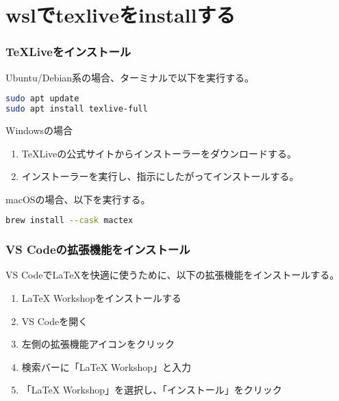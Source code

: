 \documentclass{article}
\begin{document}
\part{wslでtexliveをinstallする}

\section{TeXLiveをインストール}
Ubuntu/Debian系の場合、ターミナルで以下を実行する。\par

\begin{lstlisting}[language=bash]
sudo apt update
sudo apt install texlive-full
\end{lstlisting}

Windowsの場合\par
\begin{enumerate}
\item TeXLiveの公式サイトからインストーラーをダウンロードする。\par
\item インストーラーを実行し、指示にしたがってインストールする。\par
\end{enumerate}

\par
macOSの場合、以下を実行する。\par

\begin{lstlisting}[language=bash]
brew install --cask mactex
\end{lstlisting}

\section{VS Codeの拡張機能をインストール}
VS CodeでLaTeXを快適に使うために、以下の拡張機能をインストールする。\par

\begin{enumerate}
\item LaTeX Workshopをインストールする\par
\item VS Codeを開く\par
\item 左側の拡張機能アイコンをクリック\par
\item 検索バーに「LaTeX Workshop」と入力\par
\item「LaTeX Workshop」を選択し、「インストール」をクリック\par
\end{enumerate}
\end{document}
